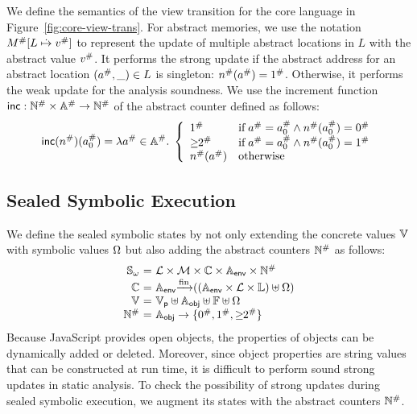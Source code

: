 We define the semantics of the view transition for the core language in
Figure~\ref{fig:core-view-trans}.  For abstract memories, we use the notation
${M}^{\#}[L \;\dot{\mapsto}\; {v}^{\#}]$ to represent the update of multiple abstract
locations in $L$ with the abstract value ${v}^{\#}$.  It performs the strong
update if the abstract address for an abstract location $({a}^{\#}, \_) \in L$
is singleton: ${n}^{\#}({a}^{\#}) = {1}^{\#}$.  Otherwise, it performs the weak
update for the analysis soundness.  We use the increment function $\textsf{inc}:
{\mathbb{N}}^{\#} \times {\mathbb{A}}^{\#} \rightarrow {\mathbb{N}}^{\#}$ of the abstract
counter defined as follows:
\[
  \textsf{inc}({n}^{\#})({a}^{\#}_0) = \lambda {a}^{\#} \in {\mathbb{A}}^{\#}. \; \left\{
    \begin{array}{ll}
      {1}^{\#} & \text{if} \; {a}^{\#} = {a}^{\#}_0 \wedge
      {n}^{\#}({a}^{\#}_0) = {0}^{\#}\\
      {\geq\!\!2}^{\#} & \text{if} \; {a}^{\#} = {a}^{\#}_0 \wedge
      {n}^{\#}({a}^{\#}_0) = {1}^{\#}\\
      {n}^{\#}({a}^{\#}) & \text{otherwise}
    \end{array}
  \right.
\]


\subsection{Sealed Symbolic Execution}

We define the sealed symbolic states by not only extending the concrete values
$\mathbb{V}$ with symbolic values $\Omega$ but also adding the abstract counters
${\mathbb{N}}^{\#}$ as follows:
\[
  \begin{array}{r@{~}c@{~}l}
    \symbstset &=& \labset \times \memset \times \ctxtset \times \eaddrset
    \times \abscountset\\
    \ctxtset &=& \eaddrset \finmap ((\eaddrset \times \labset \times \locset)
    \uplus \symbset)\\
    \valset &=& \pvalset \uplus \oaddrset \uplus \fvalset \uplus \symbset\\
    \abscountset &=& \oaddrset \rightarrow \{ \abszero, \absone, \absmany \}\\
  \end{array}
\]
Because JavaScript provides open objects, the properties of objects can be dynamically added or deleted.
Moreover, since object properties are string values that can be constructed at run time,
it is difficult to perform sound strong updates in static analysis.
To check the possibility of strong updates during sealed symbolic execution,
we augment its states with the abstract counters ${\mathbb{N}}^{\#}$.

